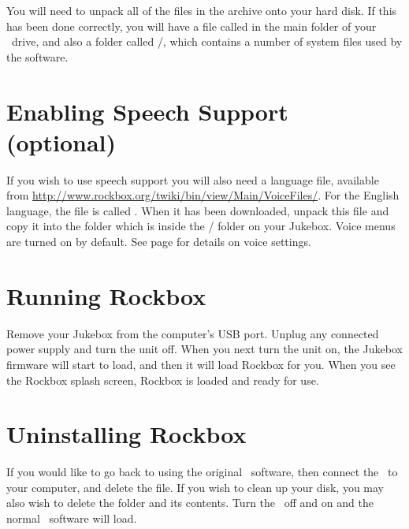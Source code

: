 You will need to unpack all of the files in the archive onto your hard disk. If
 this has been done correctly, you will have a file called 
\fname{\firmwarefilename} in the main folder of your \playername\ drive, and
also a folder called /, which contains a number of system files
used by the software.

\section{Enabling Speech Support (optional)}\label{sec:enabling_speech_support}
If you wish to use speech support you will also need a language file, available
from \url{http://www.rockbox.org/twiki/bin/view/Main/VoiceFiles/}.  For the
English language, the file is called . When it has been
downloaded, unpack this file and copy it into the  folder which is
inside the / folder on your Jukebox. Voice menus are turned on
by default. See page \pageref{ref:Voiceconfiguration} for details on voice
settings.


\section{Running Rockbox}
Remove your Jukebox from the computer's USB port. Unplug any connected power
supply and turn the unit off. When you next turn the unit on, the Jukebox
firmware will start to load, and then it will load Rockbox for you. When you see
the Rockbox splash screen, Rockbox is loaded and ready for use.

\section{Uninstalling Rockbox}
If you would like to go back to using the original \playername\ software, then
connect the \playername\ to your computer, and delete the
\fname{\firmwarefilename} file. If you wish to clean up your disk, you may also
wish to delete the  folder and its contents. Turn the
\playername\ off and on and the normal \playername\ software will load.

